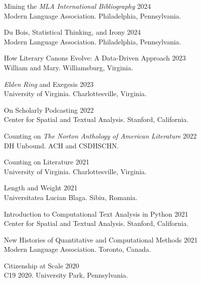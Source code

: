 \documentclass[
  12pt,
  letterpaper,
]{article}
\begin{document}
Mining the \emph{MLA International Bibliography} \hfill 2024\\
\hspace*{0.333em} Modern Language Association. Philadelphia, Pennsylvania.

Du Bois, Statistical Thinking, and Irony \hfill 2024\\
\hspace*{0.333em} Modern Language Association. Philadelphia, Pennsylvania.

How Literary Canons Evolve: A Data-Driven Approach \hfill 2023\\
\hspace*{0.333em} William and Mary. Williamsburg, Virginia.

\emph{Elden Ring} and Exegesis \hfill 2023\\
\hspace*{0.333em} University of Virginia. Charlottesville, Virginia.

On Scholarly Podcasting \hfill 2022\\
\hspace*{0.333em} Center for Spatial and Textual Analysis. Stanford,
California.

Counting on \emph{The Norton Anthology of American Literature}
\hfill 2022\\
\hspace*{0.333em} DH Unbound. ACH and CSDH\textbar SCHN.

Counting on Literature \hfill 2021\\
\hspace*{0.333em} University of Virginia. Charlottesville, Virginia.

Length and Weight \hfill 2021\\
\hspace*{0.333em} Universitatea Lucian Blaga. Sibiu, Romania.

Introduction to Computational Text Analysis in Python \hfill 2021\\
\hspace*{0.333em} Center for Spatial and Textual Analysis. Stanford,
California.

New Histories of Quantitative and Computational Methods \hfill 2021\\
\hspace*{0.333em} Modern Language Association. Toronto, Canada.

Citizenship at Scale \hfill 2020\\
\hspace*{0.333em} C19 2020. University Park, Pennsylvania.
\end{document}
